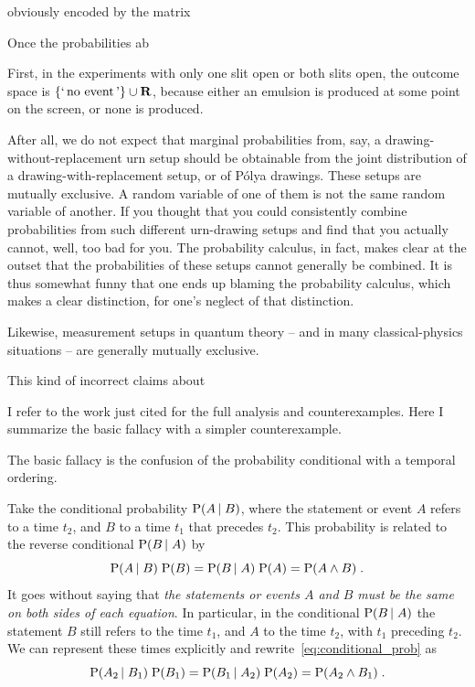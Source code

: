 \documentclass[\ifafour a4paper,12pt,\else a5paper,10pt,\fi%
onecolumn,oneside,article,%
british%
]{memoir}
\newcommand*{\defquote}[1]{`\,#1\,'}
\theoremstyle{remark}
\theoremstyle{innote}
\newcommand*{\RR}{\bm{\mathrm{R}}}
\DeclarePairedDelimiter\set{\{}{\}}
\newcommand*{\p}{\mathrm{P}}%
\renewcommand*{\|}[1][]{\nonscript\,#1\vert\nonscript\;\mathopen{}}
\begin{document}
obviously encoded by the matrix


Once the probabilities ab




First, in the experiments with only one slit open or both slits open, the outcome
space is $\set{\textrm{\defquote{no event}}} \cup \RR$, because either an
emulsion is produced at some point on the screen, or none is produced.





After all, we do not expect that marginal probabilities from, say, a
drawing-without-replacement urn setup should be obtainable from the joint
distribution of a drawing-with-replacement setup, or of P\'olya drawings.
These setups are mutually exclusive. A random variable of one of them is
not the same random variable of another. If you thought that you could
consistently combine probabilities from such different urn-drawing setups
and find that you actually cannot, well, too bad for you. The probability
calculus, in fact, makes clear at the outset that the probabilities of these
setups cannot generally be combined. It is thus somewhat funny that one
ends up blaming the probability calculus, which makes a clear distinction,
for one's neglect of that distinction.


Likewise, measurement setups
in quantum theory -- and in many classical-physics situations -- are
generally mutually exclusive.

This kind of incorrect claims about

I refer to the work just cited for the full analysis and counterexamples.
Here I summarize the basic fallacy with a simpler counterexample.

\medskip

The basic fallacy is the confusion of the probability conditional with a
temporal ordering.

Take the conditional probability $\p(A \| B)$, where the statement or event
$A$ refers to a time $t_{2}$, and $B$ to a time $t_{1}$ that precedes
$t_{2}$. This probability is related to the reverse conditional
$\p(B \| A)$ by
\begin{equation}
  \label{eq:conditional_prob}
  \p(A \| B)\; \p(B) = \p(B \| A) \; \p(A) = \p(A \land B) \;.
\end{equation}
It goes without saying that \emph{the statements or events $A$ and $B$ must
  be the same on both sides of each equation}. In particular, in the
conditional $\p(B \| A)$ the statement $B$ still refers to the time
$t_{1}$, and $A$ to the time $t_{2}$, with $t_{1}$ preceding $t_{2}$. We
can represent these times explicitly and
rewrite~\eqref{eq:conditional_prob} as
\begin{equation}
  \label{eq:conditional_prob_time}
  \p(A_{2} \| B_{1})\; \p(B_{1}) = \p(B_{1} \| A_{2}) \; \p(A_{2})
  = \p(A_{2} \land B_{1}) \;.
\end{equation}
\end{document}
